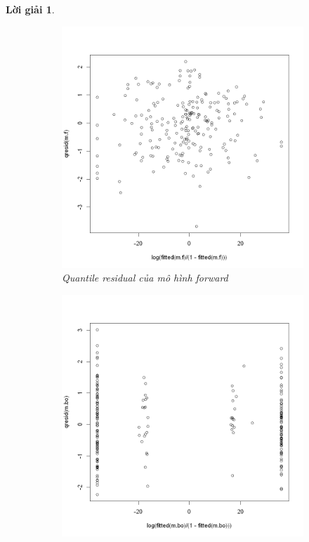 \documentclass[14pt, a4paper]{article}
\theoremstyle{sltheorem}
\theoremstyle{soltheorem}
\newtheorem*{loigiai}{Lời giải}
\begin{document}
\begin{loigiai}
    \begin{figure}[h!]
        \centering
        \begin{subfigure}[b]{0.4\textwidth}
            \centering
            \includegraphics[width=1.0\textwidth]{figures/mf_fitted.png}
            \caption{Quantile residual của mô hình forward}
        \end{subfigure}
        \hfill
        \begin{subfigure}[b]{0.4\linewidth}
            \centering
            \includegraphics[width=1.0\linewidth]{figures/mb_fitted.png}

\end{subfigure}
\end{figure}
\end{loigiai}
\end{document}
